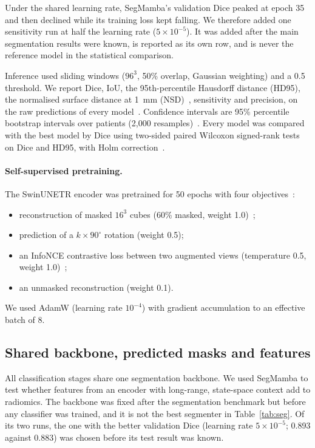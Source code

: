 \documentclass[11pt]{article}
\begin{document}
Under the shared learning rate, SegMamba's validation Dice peaked at epoch 35 and then declined while its training
loss kept falling. We therefore added one sensitivity run at half the learning rate ($5 \times 10^{-5}$). It was
added after the main segmentation results were known, is reported as its own row, and is never the reference model
in the statistical comparison.

Inference used sliding windows ($96^3$, 50\% overlap, Gaussian weighting) and a 0.5 threshold. We report Dice, IoU,
the 95th-percentile Hausdorff distance (HD95), the normalised surface distance at 1~mm
(NSD)~\cite{nikolov2021nsd}, sensitivity and precision, on the raw predictions of every
model~\cite{maierhein2024metrics}. Confidence intervals are 95\% percentile bootstrap intervals over patients
(2,000 resamples)~\cite{efron1993bootstrap}. Every model was compared with the best model by Dice using two-sided
paired Wilcoxon signed-rank tests~\cite{wilcoxon1945} on Dice and HD95, with Holm correction~\cite{holm1979}.

\paragraph{Self-supervised pretraining.} The SwinUNETR encoder was pretrained for 50 epochs with four
objectives~\cite{tang2022ssl}:
\begin{itemize}
  \item reconstruction of masked $16^3$ cubes (60\% masked, weight 1.0)~\cite{he2022mae};
  \item prediction of a $k \times 90^\circ$ rotation (weight 0.5);
  \item an InfoNCE contrastive loss between two augmented views (temperature 0.5, weight
        1.0)~\cite{oord2018cpc,chen2020simclr};
  \item an unmasked reconstruction (weight 0.1).
\end{itemize}
We used AdamW (learning rate $10^{-4}$) with gradient accumulation to an effective batch of 8.

\subsection{Shared backbone, predicted masks and features}
All classification stages share one segmentation backbone. We used SegMamba to test whether features from an
encoder with long-range, state-space context add to radiomics. The backbone was fixed after the segmentation
benchmark but before any classifier was trained, and it is not the best segmenter in Table~\ref{tab:seg}. Of its
two runs, the one with the better validation Dice (learning rate $5 \times 10^{-5}$; 0.893 against 0.883) was
chosen before its test result was known.
\end{document}
